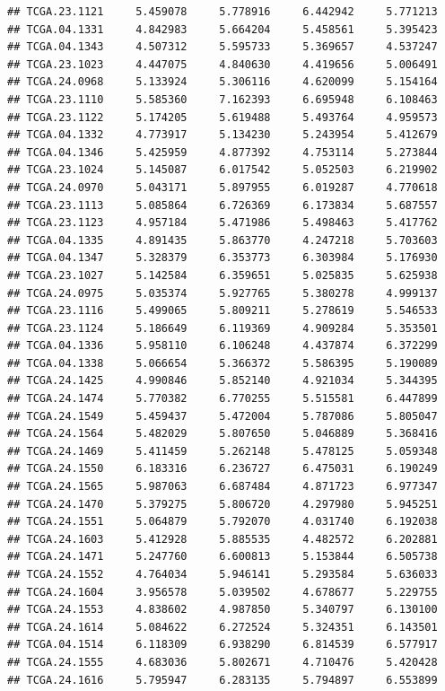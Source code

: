 \documentclass[UTF8]{beamer}\usepackage[]{graphicx}\usepackage[]{color}
\makeatletter
\newenvironment{kframe}{%
 \def\at@end@of@kframe{}%
 \ifinner\ifhmode%
  \def\at@end@of@kframe{\end{minipage}}%
  \begin{minipage}{\columnwidth}%
 \fi\fi%
 \def\FrameCommand##1{\hskip\@totalleftmargin \hskip-\fboxsep
 \colorbox{shadecolor}{##1}\hskip-\fboxsep
     \hskip-\linewidth \hskip-\@totalleftmargin \hskip\columnwidth}%
 \MakeFramed {\advance\hsize-\width
   \@totalleftmargin\z@ \linewidth\hsize
   \@setminipage}}%
 {\par\unskip\endMakeFramed%
 \at@end@of@kframe}
\newenvironment{knitrout}{}{} %
\makeatother
\begin{document}
\begin{frame}[fragile]
\begin{knitrout}
\begin{kframe}
\begin{verbatim}
## TCGA.23.1121     5.459078     5.778916     6.442942     5.771213
## TCGA.04.1331     4.842983     5.664204     5.458561     5.395423
## TCGA.04.1343     4.507312     5.595733     5.369657     4.537247
## TCGA.23.1023     4.447075     4.840630     4.419656     5.006491
## TCGA.24.0968     5.133924     5.306116     4.620099     5.154164
## TCGA.23.1110     5.585360     7.162393     6.695948     6.108463
## TCGA.23.1122     5.174205     5.619488     5.493764     4.959573
## TCGA.04.1332     4.773917     5.134230     5.243954     5.412679
## TCGA.04.1346     5.425959     4.877392     4.753114     5.273844
## TCGA.23.1024     5.145087     6.017542     5.052503     6.219902
## TCGA.24.0970     5.043171     5.897955     6.019287     4.770618
## TCGA.23.1113     5.085864     6.726369     6.173834     5.687557
## TCGA.23.1123     4.957184     5.471986     5.498463     5.417762
## TCGA.04.1335     4.891435     5.863770     4.247218     5.703603
## TCGA.04.1347     5.328379     6.353773     6.303984     5.176930
## TCGA.23.1027     5.142584     6.359651     5.025835     5.625938
## TCGA.24.0975     5.035374     5.927765     5.380278     4.999137
## TCGA.23.1116     5.499065     5.809211     5.278619     5.546533
## TCGA.23.1124     5.186649     6.119369     4.909284     5.353501
## TCGA.04.1336     5.958110     6.106248     4.437874     6.372299
## TCGA.04.1338     5.066654     5.366372     5.586395     5.190089
## TCGA.24.1425     4.990846     5.852140     4.921034     5.344395
## TCGA.24.1474     5.770382     6.770255     5.515581     6.447899
## TCGA.24.1549     5.459437     5.472004     5.787086     5.805047
## TCGA.24.1564     5.482029     5.807650     5.046889     5.368416
## TCGA.24.1469     5.411459     5.262148     5.478125     5.059348
## TCGA.24.1550     6.183316     6.236727     6.475031     6.190249
## TCGA.24.1565     5.987063     6.687484     4.871723     6.977347
## TCGA.24.1470     5.379275     5.806720     4.297980     5.945251
## TCGA.24.1551     5.064879     5.792070     4.031740     6.192038
## TCGA.24.1603     5.412928     5.885535     4.482572     6.202881
## TCGA.24.1471     5.247760     6.600813     5.153844     6.505738
## TCGA.24.1552     4.764034     5.946141     5.293584     5.636033
## TCGA.24.1604     3.956578     5.039502     4.678677     5.229755
## TCGA.24.1553     4.838602     4.987850     5.340797     6.130100
## TCGA.24.1614     5.084622     6.272524     5.324351     6.143501
## TCGA.04.1514     6.118309     6.938290     6.814539     6.577917
## TCGA.24.1555     4.683036     5.802671     4.710476     5.420428
## TCGA.24.1616     5.795947     6.283135     5.794897     6.553899

\end{verbatim}
\end{kframe}
\end{knitrout}
\end{frame}
\end{document}
